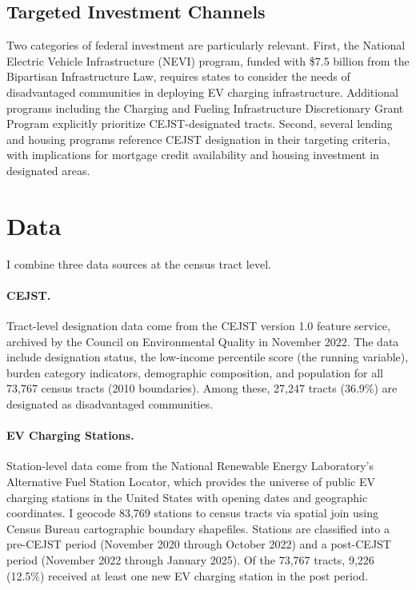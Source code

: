 \documentclass[12pt]{article}
\begin{document}
\subsection{Targeted Investment Channels}

Two categories of federal investment are particularly relevant. First, the National Electric Vehicle Infrastructure (NEVI) program, funded with \$7.5 billion from the Bipartisan Infrastructure Law, requires states to consider the needs of disadvantaged communities in deploying EV charging infrastructure. Additional programs including the Charging and Fueling Infrastructure Discretionary Grant Program explicitly prioritize CEJST-designated tracts. Second, several lending and housing programs reference CEJST designation in their targeting criteria, with implications for mortgage credit availability and housing investment in designated areas.

\section{Data}

I combine three data sources at the census tract level.

\paragraph{CEJST.} Tract-level designation data come from the CEJST version 1.0 feature service, archived by the Council on Environmental Quality in November 2022. The data include designation status, the low-income percentile score (the running variable), burden category indicators, demographic composition, and population for all 73,767 census tracts (2010 boundaries). Among these, 27,247 tracts (36.9\%) are designated as disadvantaged communities.

\paragraph{EV Charging Stations.} Station-level data come from the National Renewable Energy Laboratory's Alternative Fuel Station Locator, which provides the universe of public EV charging stations in the United States with opening dates and geographic coordinates. I geocode 83,769 stations to census tracts via spatial join using Census Bureau cartographic boundary shapefiles. Stations are classified into a pre-CEJST period (November 2020 through October 2022) and a post-CEJST period (November 2022 through January 2025). Of the 73,767 tracts, 9,226 (12.5\%) received at least one new EV charging station in the post period.
\end{document}
